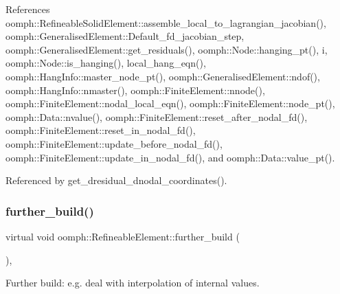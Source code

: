 References oomph\+::\+Refineable\+Solid\+Element\+::assemble\+\_\+local\+\_\+to\+\_\+lagrangian\+\_\+jacobian(), oomph\+::\+Generalised\+Element\+::\+Default\+\_\+fd\+\_\+jacobian\+\_\+step, oomph\+::\+Generalised\+Element\+::get\+\_\+residuals(), oomph\+::\+Node\+::hanging\+\_\+pt(), i, oomph\+::\+Node\+::is\+\_\+hanging(), local\+\_\+hang\+\_\+eqn(), oomph\+::\+Hang\+Info\+::master\+\_\+node\+\_\+pt(), oomph\+::\+Generalised\+Element\+::ndof(), oomph\+::\+Hang\+Info\+::nmaster(), oomph\+::\+Finite\+Element\+::nnode(), oomph\+::\+Finite\+Element\+::nodal\+\_\+local\+\_\+eqn(), oomph\+::\+Finite\+Element\+::node\+\_\+pt(), oomph\+::\+Data\+::nvalue(), oomph\+::\+Finite\+Element\+::reset\+\_\+after\+\_\+nodal\+\_\+fd(), oomph\+::\+Finite\+Element\+::reset\+\_\+in\+\_\+nodal\+\_\+fd(), oomph\+::\+Finite\+Element\+::update\+\_\+before\+\_\+nodal\+\_\+fd(), oomph\+::\+Finite\+Element\+::update\+\_\+in\+\_\+nodal\+\_\+fd(), and oomph\+::\+Data\+::value\+\_\+pt().



Referenced by get\+\_\+dresidual\+\_\+dnodal\+\_\+coordinates().

\mbox{\label{classoomph_1_1RefineableElement_a26628ce36dfad028686adeb4694a9ef3}} 
\subsubsection{\texorpdfstring{further\+\_\+build()}{further\_build()}}
{\footnotesize\ttfamily virtual void oomph\+::\+Refineable\+Element\+::further\+\_\+build (\begin{DoxyParamCaption}{ }\end{DoxyParamCaption})\hspace{0.3cm}{\ttfamily [inline]}, {\ttfamily [virtual]}}



Further build\+: e.\+g. deal with interpolation of internal values. 



